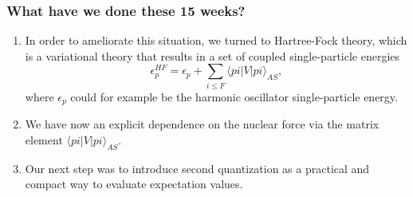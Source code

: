 \documentclass[compress]{beamer}
\begin{document}
\frame
{
  \frametitle{What have we done these 15 weeks?}
\begin{enumerate}
\item In order to ameliorate this situation, we turned to Hartree-Fock theory, which is a variational theory that results in  a set of coupled
single-particle energies
\[
\epsilon_{p}^{HF}=\epsilon_p  + \sum_{i\le F} \langle pi | V | pi\rangle_{AS},
\]
where $\epsilon_p$ could for example be the  harmonic oscillator single-particle energy. 
\item We have now an explicit dependence on the nuclear force via the matrix element  $\langle pi | V | pi\rangle_{AS}$. 
\item Our next step was to introduce second quantization as a practical and compact way to evaluate expectation  values. 
\end{enumerate}
}
\end{document}
